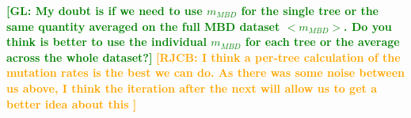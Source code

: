 \documentclass{article}
\newcommand*\richel[1]{\textcolor{orange}{\textbf{[RJCB: #1]}}}
\newcommand*\gio[1]{\textcolor{green}{\textbf{[GL: #1]}}}
\begin{document}




\gio{My doubt is if we need to use $m_{MBD}$ for the single tree or the same
quantity averaged on the full MBD dataset $<m_{MBD}>$.
Do you think is better to use the
individual $m_{MBD}$ for each tree or the average across the whole
dataset?}
\richel{
  I think a per-tree calculation of the mutation rates 
  is the best we can do. As there was some noise between us above,
  I think the iteration after the next will allow us to get a better
  idea about this
}

\end{document}
